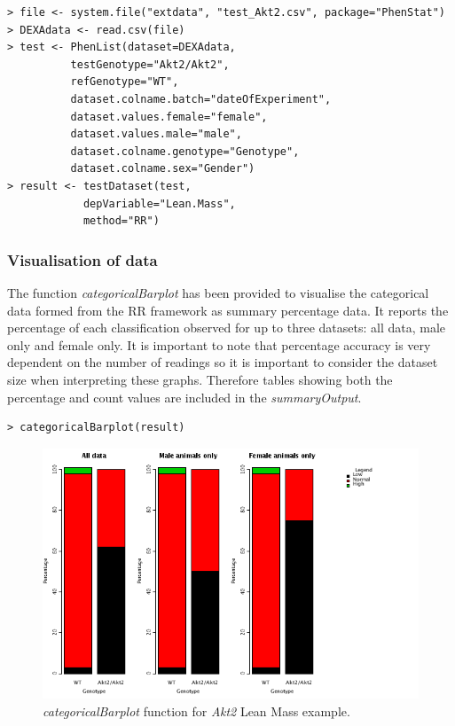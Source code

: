 \documentclass[12pt,a4paper]{article}
\begin{document}
\begingroup
\fontsize{8pt}{12pt}\selectfont
\begin{verbatim}
> file <- system.file("extdata", "test_Akt2.csv", package="PhenStat") 
> DEXAdata <- read.csv(file)
> test <- PhenList(dataset=DEXAdata,
		  testGenotype="Akt2/Akt2",
		  refGenotype="WT",
		  dataset.colname.batch="dateOfExperiment",
		  dataset.values.female="female",
		  dataset.values.male="male", 
		  dataset.colname.genotype="Genotype", 
		  dataset.colname.sex="Gender")
> result <- testDataset(test, 
			depVariable="Lean.Mass", 
			method="RR")
\end{verbatim}
\endgroup 

\subsubsection{Visualisation of data}
The function \textit{categoricalBarplot} has been provided to visualise the categorical data formed from the RR framework as summary percentage data. It reports the percentage of each classification observed for up to three datasets: all data, male only and female only. It is important to note that percentage accuracy is very dependent on the number of readings so it is important to consider the dataset size when interpreting these graphs. Therefore tables showing both the percentage and count values are included in the \textit{summaryOutput}.


\begingroup
    \fontsize{8pt}{12pt}\selectfont
\begin{verbatim}
> categoricalBarplot(result)
\end{verbatim}
\endgroup 

\begin{figure}[H]%
\centerline{\includegraphics[scale=0.5]{RR_graph.png}}
\caption{\textit{categoricalBarplot} function for \textit{Akt2} Lean Mass example.}\label{fig:16a}
\end{figure}
\end{document}
